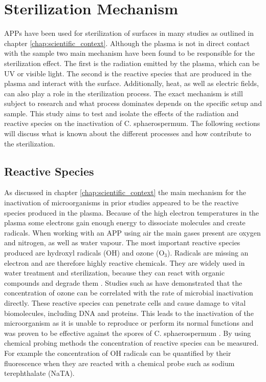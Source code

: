 \section{Sterilization Mechanism}
APPs have been used for sterilization of surfaces in many studies as outlined in chapter \ref{chap:scientific_context}. Although the plasma is not in direct contact with the sample two main mechanism have been found to be responsible for the sterilization effect. The first is the radiation emitted by the plasma, which can be UV or visible light. The second is the reactive species that are produced in the plasma and interact with the surface. Additionally, heat, as well as electric fields, can also play a role in the sterilization process. The exact mechanism is still subject to research and what process dominates depends on the specific setup and sample. This study aims to test and isolate the effects of the radiation and reactive species on the inactivation of C. sphaerospermum. The following sections will discuss what is known about the different processes and how contribute to the sterilization.

\subsection{Reactive Species}
As discussed in chapter \ref{chap:scientific_context} the main mechanism for the inactivation of microorganisms in prior studies appeared to be the reactive species produced in the plasma. Because of the high electron temperatures in the plasma some electrons gain enough energy to dissociate molecules and create radicals. When working with an APP using air the main gases present are oxygen and nitrogen, as well as water vapour. The most important reactive species produced are hydroxyl radicals (OH) and ozone (O$_3$). Radicals are missing an electron and are therefore highly reactive chemicals. They are widely used in water treatment and sterilization, because they can react with organic compounds and degrade them \cite{water}. Studies such as \cite{ozone} have demonstrated that the concentration of ozone can be correlated with the rate of microbial inactivation directly. These reactive species can penetrate cells and cause damage to vital biomolecules, including DNA and proteins.
This leads to the inactivation of the microorganism as it is unable to reproduce or perform its normal functions and was proven to be effective against the spores of C. sphaerospermum \cite{kit}. By using chemical probing methods the concentration of reactive species can be measured. For example the concentration of OH radicals can be quantified by their fluorescence when they are reacted with a chemical probe such as sodium terephthalate (NaTA). 

